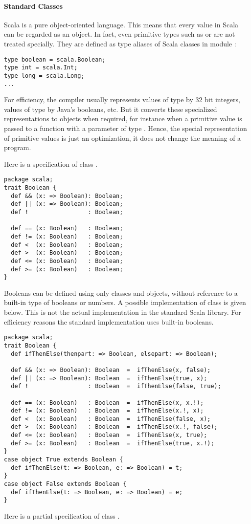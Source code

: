 \paragraph{Standard Classes}


Scala is a pure object-oriented language. This means that every value
in Scala can be regarded as an object.  In fact, even primitive types
such as  or  are not treated specially. They
are defined as type aliases of Scala classes in module :
\begin{lstlisting}
type boolean = scala.Boolean;
type int = scala.Int;
type long = scala.Long;
...
\end{lstlisting}
For efficiency, the compiler usually represents values of type
 by 32 bit integers, values of type
 by Java's booleans, etc.  But it converts these
specialized representations to objects when required, for instance
when a primitive  value is passed to a function with a
parameter of type .  Hence, the special representation of
primitive values is just an optimization, it does not change the
meaning of a program.

Here is a specification of class .
\begin{lstlisting}
package scala;
trait Boolean {
  def && (x: => Boolean): Boolean;
  def || (x: => Boolean): Boolean;
  def !                 : Boolean;

  def == (x: Boolean)   : Boolean;
  def != (x: Boolean)   : Boolean;
  def <  (x: Boolean)   : Boolean;
  def >  (x: Boolean)   : Boolean;
  def <= (x: Boolean)   : Boolean;
  def >= (x: Boolean)   : Boolean;
}
\end{lstlisting}
Booleans can be defined using only classes and objects, without
reference to a built-in type of booleans or numbers. A possible
implementation of class  is given below.  This is not
the actual implementation in the standard Scala library. For
efficiency reasons the standard implementation uses built-in
booleans.
\begin{lstlisting}
package scala;
trait Boolean {
  def ifThenElse(thenpart: => Boolean, elsepart: => Boolean);

  def && (x: => Boolean): Boolean  =  ifThenElse(x, false);
  def || (x: => Boolean): Boolean  =  ifThenElse(true, x);
  def !                 : Boolean  =  ifThenElse(false, true);

  def == (x: Boolean)   : Boolean  =  ifThenElse(x, x.!);
  def != (x: Boolean)   : Boolean  =  ifThenElse(x.!, x);
  def <  (x: Boolean)   : Boolean  =  ifThenElse(false, x);
  def >  (x: Boolean)   : Boolean  =  ifThenElse(x.!, false);
  def <= (x: Boolean)   : Boolean  =  ifThenElse(x, true);
  def >= (x: Boolean)   : Boolean  =  ifThenElse(true, x.!);
}
case object True extends Boolean {
  def ifThenElse(t: => Boolean, e: => Boolean) = t;
}
case object False extends Boolean {
  def ifThenElse(t: => Boolean, e: => Boolean) = e;
}
\end{lstlisting}
Here is a partial specification of class .

